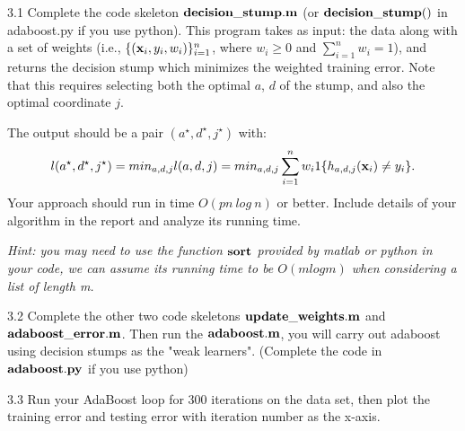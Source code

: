 \documentclass{article}
\theoremstyle{definition}
\theoremstyle{definition}
\theoremstyle{remark}
\begin{document}
3.1 Complete the code skeleton $\bold{decision\_stump.m}$ (or $\bold{decision\_stump()}$ in adaboost.py if you use python). This program takes as input: the data along with a set of weights (i.e., $\{(\bold{x}_{i}, y_{i}, w_{i})\}_{i=1}^{n}$, where $w_{i} \geq 0$ and $\sum_{i=1}^{n}w_{i}=1$), and returns the decision stump which minimizes the weighted training error. Note that this requires selecting both the optimal $a$, $d$ of the stump, and also the optimal coordinate $j$.

The output should be a pair $(a^{\star}, d^{\star}, j^{\star})$ with:
\begin{eqnarray}
l(a^{\star}, d^{\star}, j^{\star})=min_{a, d, j}l(a, d, j)=min_{a, d, j}\sum_{i=1}^{n}w_{i}1\{h_{a, d, j}(\bold{x}_{i})\neq y_{i}\}.
\end{eqnarray}
Your approach should run in time $O(pn\ log\ n)$ or better. Include details of your algorithm in the report and analyze its running time.

\emph{Hint: you may need to use the function $\bold{sort}$ provided by matlab or python in your code, we can assume its running time to be $O(m log m)$ when considering a list of length m.}

3.2 Complete the other two code skeletons $\bold{update\_weights.m}$ and $\bold{adaboost\_error.m}$. Then run the $\bold{adaboost.m}$, you will carry out adaboost using decision stumps as the "weak learners". (Complete the code in $\bold{adaboost.py}$ if you use python)

3.3 Run your AdaBoost loop for 300 iterations on the data set, then plot the training error and testing error with iteration number as the x-axis.
\end{document}
